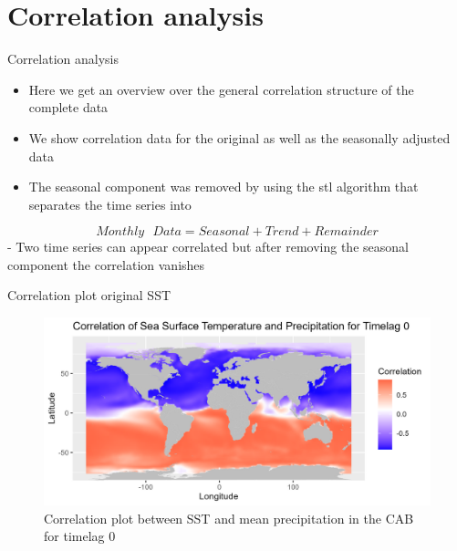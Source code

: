 \documentclass[
  ignorenonframetext,
]{beamer}
\providecommand{\tightlist}{%
  \setlength{\itemsep}{0pt}\setlength{\parskip}{0pt}}
\begin{document}
\hypertarget{correlation-analysis}{%
\section{Correlation analysis}\label{correlation-analysis}}

\begin{frame}{Correlation analysis}
\protect\hypertarget{correlation-analysis-1}{}
\begin{itemize}
\tightlist
\item
  Here we get an overview over the general correlation structure of the
  complete data
\item
  We show correlation data for the original as well as the seasonally
  adjusted data
\item
  The seasonal component was removed by using the stl algorithm that
  separates the time series into
\end{itemize}

\[ Monthly \textit{ } Data = Seasonal + Trend + Remainder\] - Two time
series can appear correlated but after removing the seasonal component
the correlation vanishes
\end{frame}

\begin{frame}{Correlation plot original SST}
\protect\hypertarget{correlation-plot-original-sst}{}
\begin{figure}

{\centering \includegraphics[width=0.65\linewidth,height=0.65\textheight]{../pres-plots/og-data/corr-0} 

}

\caption{Correlation plot between SST and mean precipitation in the CAB for timelag 0}\label{fig:corr-0}
\end{figure}
\end{frame}
\end{document}
